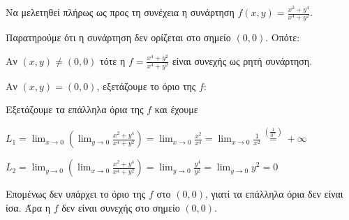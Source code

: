 \begin{example}
  Να μελετηθεί πλήρως ως προς τη συνέχεια η συνάρτηση 
  $ f(x,y) = \frac{x^{2}+y^{4}}{x^{4}+y^{2}} $.
  \begin{solution}
  \item {}
    Παρατηρούμε ότι η συνάρτηση δεν ορίζεται στο σημείο $ (0,0) $. Οπότε:

    Αν $ (x,y) \neq (0,0) $ τότε η $f= \frac{x^{4}+y^{2}}{x^{4}+y^{2}} $ είναι συνεχής 
    ως ρητή συνάρτηση.

    Αν $ (x,y)=(0,0) $, εξετάζουμε το όριο της $f$: 

    Εξετάζουμε τα επάλληλα όρια της $f$ και έχουμε
    \begin{myitemize}
      \item $ L_{1} = \lim_{x \to 0} 
        \left( 
          \lim_{y \to 0} \frac{x^{2}+y^{4}}{x^{4}+y^{2}} 
        \right) = \lim_{x \to 0} \frac{x^{2}}{x^{4}} = \lim_{x \to 0} \frac{1}{x^{2}}
        \overset{(\frac{1}{0^{+}})}{=} +\infty $
      \item $ L_{2} = \lim_{y \to 0} 
        \left(
          \lim_{x \to 0} 
          \frac{x^{2}+y^{4}}{x^{4}+y^{2}}
        \right) = \lim_{y \to 0} \frac{y^{4}}{y^{2}} = \lim_{y \to 0} y^{2} = 0 $
    \end{myitemize}
    Επομένως δεν υπάρχει το όριο της $f$ στο $ (0,0) $, γιατί τα επάλληλα όρια δεν 
    είναι ίσα.
    Άρα η $f$ δεν είναι συνεχής στο σημείο $(0,0)$.
  \end{solution}
\end{example}






